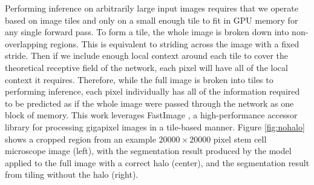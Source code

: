 \documentclass[10pt, indentfirst]{article}
\begin{document}
Performing inference on arbitrarily large input images requires that we operate based on image tiles and only on a small enough tile to fit in GPU memory for any single forward pass.
To form a tile, the whole image is broken down into non-overlapping regions.
This is equivalent to striding across the image with a fixed stride.
Then if we include enough local context around each tile to cover the theoretical receptive field of the network, each pixel will have all of the local context it requires.
Therefore, while the full image is broken into tiles to performing inference, each pixel individually has all of the information required to be predicted as if the whole image were passed through the network as one block of memory.
This work leverages FastImage \citep{Bardakoff2019}, a high-performance accessor library for processing gigapixel images in a tile-based manner.
Figure \ref{fig:nohalo} shows a cropped region from an example $\num{20000} \times \num{20000}$ pixel stem cell microscope image (left), with the segmentation result produced by the model applied to the full image with a correct halo (center), and the segmentation result from tiling without the halo (right).
\end{document}
